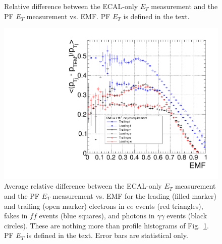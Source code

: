 \documentclass[dissertation.tex]{subfiles}
\begin{document}
\begin{figure}
	\caption{Relative difference between the ECAL-only $E_{T}$ measurement and the PF $E_{T}$ measurement vs. EMF.  PF $E_{T}$ is defined in the text.}
	\label{fig:ET_bias_vs_EMF}
\end{figure}

\begin{figure}
	\centering
	\includegraphics[scale=0.5]{4684pb-1_single_ETBias}
	\caption{Average relative difference between the ECAL-only $E_{T}$ measurement and the PF $E_{T}$ measurement vs. EMF for the leading (filled marker) and trailing (open marker) electrons in $ee$ events (red triangles), fakes in $\mathit{ff}$ events (blue squares), and photons in $\gamma\gamma$ events (black circles).  These are nothing more than profile histograms of Fig.~\ref{fig:ET_bias_vs_EMF}.  PF $E_{T}$ is defined in the text.  Error bars are statistical only.}
	\label{fig:4684pb-1_single_ETBias}
\end{figure}
\end{document}
